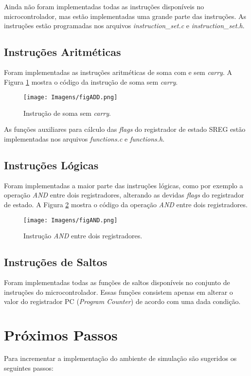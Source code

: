 \documentclass[12pt]{article}
\begin{document}
Ainda não foram implementadas todas as instruções disponíveis no microcontrolador, mas estão implementadas uma grande parte das instruções. As instruções estão programadas nos arquivos \textit{instruction\_set.c} e \textit{instruction\_set.h}.

\subsection{Instruções Aritméticas}
Foram implementadas as instruções aritméticas de soma com e sem \textit{carry}. A Figura \ref{figADD} mostra o código da instrução de soma sem \textit{carry}.

\begin{figure}[H]
  \centering
  \texttt{[image: Imagens/figADD.png]}
  \caption{Instrução de soma sem \textit{carry}.}
  \label{figADD}
\end{figure}

As funções auxiliares para cálculo das \textit{flags} do registrador de estado SREG estão implementadas nos arquivos \textit{functions.c} e \textit{functions.h}.

\subsection{Instruções Lógicas}
Foram implementadas a maior parte das instruções lógicas, como por exemplo a operação \textit{AND} entre dois registradores, alterando as devidas \textit{flags} do registrador de estado. A Figura \ref{figAND} mostra o código da operação \textit{AND} entre dois registradores.

\begin{figure}[H]
  \centering
  \texttt{[image: Imagens/figAND.png]}
  \caption{Instrução \textit{AND} entre dois registradores.}
  \label{figAND}
\end{figure}

\subsection{Instruções de Saltos}
Foram implementadas todas as funções de saltos disponíveis no conjunto de instruções do microcontrolador. Essas funções consistem apenas em alterar o valor do registrador PC (\textit{Program Counter}) de acordo com uma dada condição.

\section{Próximos Passos}
Para incrementar a implementação do ambiente de simulação são sugeridos os seguintes passos:
\end{document}

